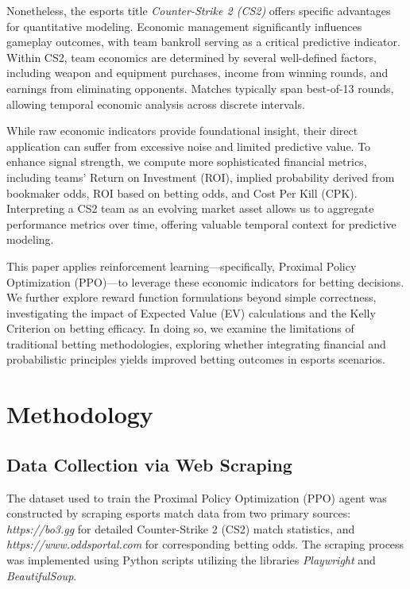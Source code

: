 \documentclass[sigconf]{acmart}
\begin{document}
Nonetheless, the esports title \textit{Counter-Strike 2 (CS2)} offers specific advantages for quantitative modeling. Economic management significantly influences gameplay outcomes, with team bankroll serving as a critical predictive indicator. Within CS2, team economics are determined by several well-defined factors, including weapon and equipment purchases, income from winning rounds, and earnings from eliminating opponents. Matches typically span best-of-13 rounds, allowing temporal economic analysis across discrete intervals.

While raw economic indicators provide foundational insight, their direct application can suffer from excessive noise and limited predictive value. To enhance signal strength, we compute more sophisticated financial metrics, including teams' Return on Investment (ROI), implied probability derived from bookmaker odds, ROI based on betting odds, and Cost Per Kill (CPK). Interpreting a CS2 team as an evolving market asset allows us to aggregate performance metrics over time, offering valuable temporal context for predictive modeling.

This paper applies reinforcement learning—specifically, Proximal Policy Optimization (PPO)—to leverage these economic indicators for betting decisions. We further explore reward function formulations beyond simple correctness, investigating the impact of Expected Value (EV) calculations and the Kelly Criterion on betting efficacy. In doing so, we examine the limitations of traditional betting methodologies, exploring whether integrating financial and probabilistic principles yields improved betting outcomes in esports scenarios.

\section{Methodology}

\subsection{Data Collection via Web Scraping}
The dataset used to train the Proximal Policy Optimization (PPO) agent was constructed by scraping esports match data from two primary sources: \textit{https://bo3.gg} for detailed Counter-Strike 2 (CS2) match statistics, and \textit{https://www.oddsportal.com} for corresponding betting odds. The scraping process was implemented using Python scripts utilizing the libraries \textit{Playwright} and \textit{BeautifulSoup}.
\end{document}

